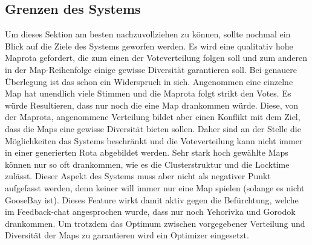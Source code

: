     \subsection{Grenzen des Systems}
        \label{s:grenzen_des_systems}
        Um dieses Sektion am besten nachzuvollziehen zu können, sollte nochmal ein Blick auf die Ziele des Systems
        geworfen werden. Es wird eine qualitativ hohe Maprota gefordert, die zum einen der Voteverteilung folgen soll und
        zum anderen in der Map-Reihenfolge einige gewisse Diversität garantieren soll. Bei genauere Überlegung ist
        das schon ein Widerspruch in sich. Angenommen eine einzelne Map hat unendlich viele Stimmen und die Maprota 
        folgt strikt den Votes. Es würde Resultieren, dass nur noch die eine Map drankommen würde. Diese, von 
        der Maprota, angenommene Verteilung bildet aber einen Konflikt mit dem Ziel, dass die Maps eine gewisse Diversität
        bieten sollen. Daher sind an der Stelle die Möglichkeiten das Systems beschränkt und die Voteverteilung kann 
        nicht immer in einer generierten Rota abgebildet werden. Sehr stark hoch gewählte Maps können nur so oft drankommen,
        wie es die Clusterstruktur und die Locktime zulässt. Dieser Aspekt des Systems muss aber nicht als negativer Punkt 
        aufgefasst werden, denn keiner will immer nur eine Map spielen (solange es nicht GooseBay ist). 
        Dieses \glqq{}Feature\grqq{} wirkt damit aktiv gegen die Befürchtung, welche im Feedback-chat angesprochen wurde,
        dass nur noch Yehorivka und Gorodok drankommen.
        Um trotzdem das Optimum zwischen vorgegebener Verteilung und Diversität der Maps zu garantieren wird ein Optimizer
        eingesetzt.\\

